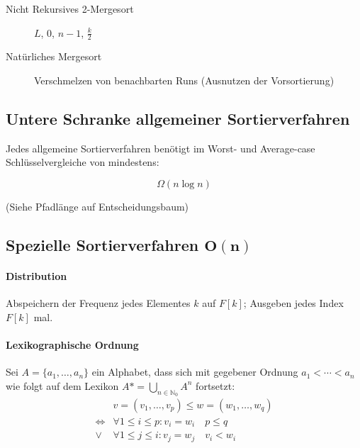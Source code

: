 \begin{description}
  \item [Nicht Rekursives 2-Mergesort]
        \begin{algorithm}[H]



          \Merge $L$, $0$, $n - 1$, $\frac{k}{2}$
        \end{algorithm}

  \item [Natürliches Mergesort]
        Verschmelzen von benachbarten Runs (Ausnutzen der Vorsortierung)

\end{description}

\subsection{Untere Schranke allgemeiner Sortierverfahren}

Jedes allgemeine Sortierverfahren benötigt im Worst- und Average-case Schlüsselvergleiche von mindestens:

$$\Omega (n \log n)$$

(Siehe Pfadlänge auf Entscheidungsbaum)

\subsection{Spezielle Sortierverfahren $\mathbf{O(n)}$}

\paragraph{Distribution}

Abspeichern der Frequenz jedes Elementes $k$ auf $F[k]$; Ausgeben jedes Index $F[k]$ mal.

\paragraph{Lexikographische Ordnung}
Sei $A = \{ a_1, \dots, a_n \}$ ein Alphabet, dass sich mit gegebener Ordnung $a_1 < \cdots < a_n$ wie folgt auf dem Lexikon $A* = \bigcup_{n \in \mathbb{N}_0} A^n$ fortsetzt:
\begin{align*}
                  & v = (v_1, \dots, v_p) \leq w = (w_1, \dots, w_q)   \\
  \Leftrightarrow & \forall 1 \leq i \leq p: v_i = w_i \quad p \leq q  \\
  \lor            & \forall 1 \leq j \leq i: v_j = w_j \quad v_i < w_i
\end{align*}

